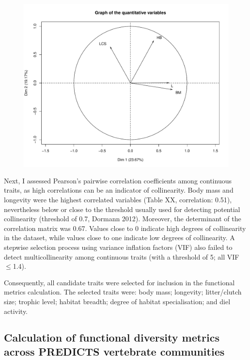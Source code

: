 \begin{figure}[h!]
\centering
\includegraphics[scale=0.75]{figures/chapter3/Quantitative_variables}
\caption[]{\textbf{}}
\label{}
\end{figure}

Next, I assessed Pearson's pairwise correlation coefficients among continuous traits, as high correlations can be an indicator of collinearity. Body mass and longevity were the highest correlated variables (Table XX, correlation: 0.51), nevertheless below or close to the threshold usually used for detecting potential collinearity (threshold of 0.7, Dormann 2012). Moreover, the determinant of the correlation matrix was 0.67. Values close to 0 indicate high degrees of collinearity in the dataset, while values close to one indicate low degrees of collinearity. A stepwise selection process using variance inflation factors (VIF) also failed to detect multicollinearity among continuous traits (with a threshold of 5; all VIF$\leq$1.4).

Consequently, all candidate traits were selected for inclusion in the functional metrics calculation. The selected traits were: body mass; longevity; litter/clutch size; trophic level;  habitat breadth; degree of habitat specialisation; and diel activity.

\subsection{Calculation of functional diversity metrics across PREDICTS vertebrate communities}

